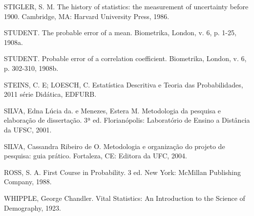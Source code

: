 STIGLER, S. M. The history of statistics: the measurement of uncertainty before 1900. Cambridge, MA: Harvard University Press, 1986. \vskip0.3cm

STUDENT. The probable error of a mean. Biometrika, London, v. 6, p. 1-25, 1908a.\vskip0.3cm

STUDENT. Probable error of a correlation coefficient. Biometrika, London, v. 6, p. 302-310, 1908b.\vskip0.3cm

STEINS, C. E; LOESCH, C. Estatística Descritiva e Teoria das Probabilidades, 2011 série Didática, EDFURB.\vskip0.3cm

SILVA, Edna Lúcia da. e Menezes, Estera M. Metodologia da pesquisa e elaboração de dissertação. 3ª ed. Florianópolis: Laboratório de Ensino a Distância da UFSC, 2001.\vskip0.3cm

SILVA, Cassandra Ribeiro de O. Metodologia e organização do projeto de pesquisa: guia prático. Fortaleza, CE: Editora da UFC, 2004.\vskip0.3cm

ROSS, S. A. First Course in Probability. 3 ed. New York:
McMillan Publishing Company, 1988.\vskip0.3cm


WHIPPLE, George Chandler. Vital Statistics: An Introduction to the Science of Demography, 1923. 







